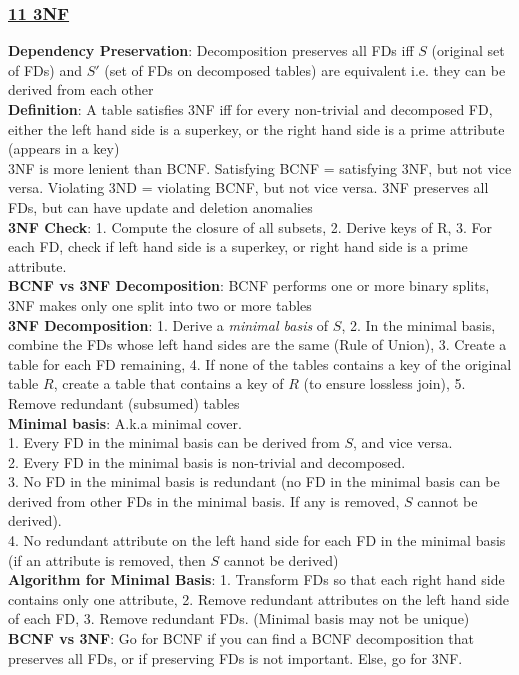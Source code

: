 \documentclass{article}
\begin{document}
{\begin{multicols*}{3}
\subsubsection*{\underline{11 3NF}}
\textbf{Dependency Preservation}: Decomposition preserves all FDs iff $S$ (original set of FDs) and $S'$ (set of FDs on decomposed tables) are equivalent i.e. they can be derived from each other \\
\textbf{Definition}: A table satisfies 3NF iff for every non-trivial and decomposed FD, either the left hand side is a superkey, or the right hand side is a prime attribute (appears in a key) \\
3NF is more lenient than BCNF. Satisfying BCNF = satisfying 3NF, but not vice versa. Violating 3ND = violating BCNF, but not vice versa. 3NF preserves all FDs, but can have update and deletion anomalies \\
\textbf{3NF Check}: 1. Compute the closure of all subsets, 2. Derive keys of R, 3. For each FD, check if left hand side is a superkey, or right hand side is a prime attribute.\\
\textbf{BCNF vs 3NF Decomposition}: BCNF performs one or more binary splits, 3NF makes only one split into two or more tables \\
\textbf{3NF Decomposition}: 1. Derive a \textit{minimal basis} of $S$, 2. In the minimal basis, combine the FDs whose left hand sides are the same (Rule of Union), 3. Create a table for each FD remaining, 4. If none of the tables contains a key of the original table $R$, create a table that contains a key of $R$ (to ensure lossless join), 5. Remove redundant (subsumed) tables \\
\textbf{Minimal basis}: A.k.a minimal cover.\\
1. Every FD in the minimal basis can be derived from $S$, and vice versa. \\
2. Every FD in the minimal basis is non-trivial and decomposed. \\
3. No FD in the minimal basis is redundant (no FD in the minimal basis can be derived from other FDs in the minimal basis. If any is removed, $S$ cannot be derived). \\
4. No redundant attribute on the left hand side for each FD in the minimal basis (if an attribute is removed, then $S$ cannot be derived) \\
\textbf{Algorithm for Minimal Basis}: 1. Transform FDs so that each right hand side contains only one attribute, 2. Remove redundant attributes on the left hand side of each FD, 3. Remove redundant FDs. (Minimal basis may not be unique)  \\
\textbf{BCNF vs 3NF}: Go for BCNF if you can find a BCNF decomposition that preserves all FDs, or if preserving FDs is not important. Else, go for 3NF.

\end{multicols*}
}

\newpage
\end{document}
